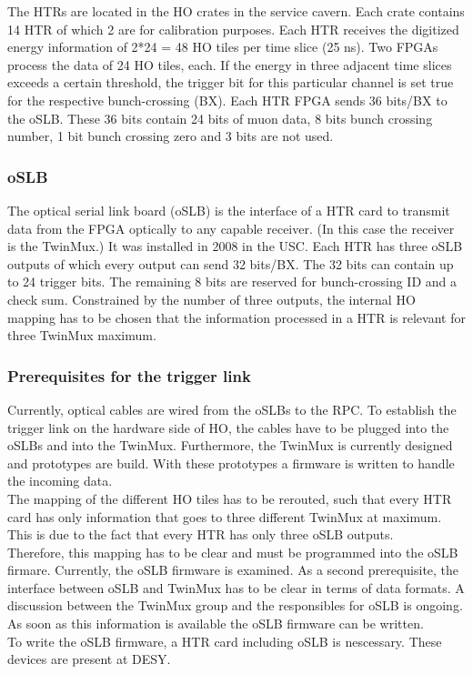 The HTRs are located in the HO crates in the service cavern. Each crate contains 14 HTR of which 2 are for calibration purposes. Each HTR receives the digitized energy information of 2*24 = 48 HO tiles per time slice (25 ns). Two FPGAs process the data of 24 HO tiles, each. If the energy in three adjacent time slices exceeds a certain threshold, the trigger bit for this particular channel is set true for the respective bunch-crossing (BX).
Each HTR FPGA sends 36 bits/BX to the oSLB. These 36 bits contain 24 bits of muon data, 8 bits bunch crossing number, 1 bit bunch crossing zero and 3 bits are not used.
\subsubsection{oSLB}
The optical serial link board (oSLB) is the interface of a HTR card to transmit data from the FPGA optically to any capable receiver. (In this case the receiver is the TwinMux.) It was installed in 2008 in the USC. Each HTR has three oSLB outputs of which every output can send 32 bits/BX. The 32 bits can contain up to 24 trigger bits. The remaining 8 bits are reserved for bunch-crossing ID and a check sum. Constrained by the number of three outputs, the internal HO mapping has to be chosen that the information processed in a HTR is relevant for three TwinMux maximum.
\subsubsection{Prerequisites for the trigger link}
Currently, optical cables are wired from the oSLBs to the RPC. To establish the trigger link on the hardware side of HO, the cables have to be plugged into the oSLBs and into the TwinMux. Furthermore, the TwinMux is currently designed and prototypes are build. With these prototypes a firmware is written to handle the incoming data.\\
The mapping of the different HO tiles has to be rerouted, such that every HTR card has only information that goes to three different TwinMux at maximum. This is due to the fact that every HTR has only three oSLB outputs.\\
Therefore, this mapping has to be clear and must be programmed into the oSLB firmare. Currently, the oSLB firmware is examined. As a second prerequisite, the interface between oSLB and TwinMux has to be clear in terms of data formats. A discussion between the TwinMux group and the responsibles for oSLB is ongoing. As soon as this information is available the oSLB firmware can be written.\\
To write the oSLB firmware, a HTR card including oSLB is nescessary. These devices are present at DESY.